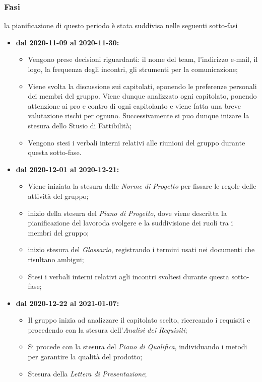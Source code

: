 \subsubsection{Fasi}
la pianificazione di questo periodo è stata suddivisa nelle seguenti sotto-fasi
\begin{itemize}
	\item \textbf{dal 2020-11-09 al 2020-11-30:}
	\begin{itemize}
	\item Vengono prese decisioni riguardanti: il nome del team, l'indirizzo e-mail, il logo, la frequenza degli incontri, gli strumenti per la comunicazione;
	\item Viene svolta la discussione sui capitolati, eponendo le preferenze personali dei membri del gruppo. Viene dunque analizzato ogni capitolato, ponendo attenzione ai pro e contro di ogni capitolanto e viene fatta una breve valutazione rischi per ognuno. Successivamente si puo dunque inizare la stesura dello Stusio di Fattibilità;
	\item Vengono stesi i verbali interni relativi alle riunioni del gruppo durante questa sotto-fase.
	\end{itemize}
	\item \textbf{dal 2020-12-01 al 2020-12-21:}
	\begin{itemize}
		\item Viene iniziata la stesura delle \textit{Norme di Progetto} per fissare le regole delle attività del gruppo;
		\item inizio della stesura del \textit{Piano di Progetto}, dove viene descritta la pianificazione del lavoroda svolgere e la suddivisione dei ruoli tra i membri del gruppo;
		\item inizio stesura del \textit{Glossario}, registrando i termini usati nei documenti che risultano ambigui;
		\item Stesi i verbali interni relativi agli incontri svoltesi durante questa sotto-fase;
	\end{itemize}
	\item \textbf{dal 2020-12-22 al 2021-01-07:}
	\begin{itemize}
		\item Il gruppo inizia ad analizzare il capitolato scelto, ricercando i requisiti e procedendo con la stesura dell'\textit{Analisi dei Requisiti};
		\item Si procede con la stesura del \textit{Piano di Qualifica}, individuando i metodi per garantire la qualità del prodotto;
		\item Stesura della \textit{Lettera di Presentazione};

\end{itemize}
\end{itemize}
